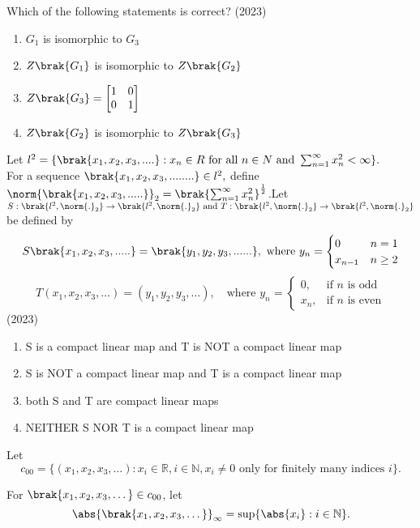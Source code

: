     Which of the following statements is correct?   \hfill (2023) 
    \begin{enumerate}[label=(\Alph*)]
        \item $G_1$ is isomorphic to $G_3$
        \item $Z\brak{G_1}$ is isomorphic to $Z\brak{G_2}$
        \item $Z\brak{G_3} = \begin{bmatrix}1&0\\0&1\end{bmatrix}$
        \item $Z\brak{G_2}$ is isomorphic to $Z\brak{G_3}$
    \end{enumerate}
    \item Let $l^2 = \{\brak{x_1, x_2, x_3,....}: x_n \in R \text{ for all }n\in N \text{ and }\sum_{n=1}^{\infty}x_n^2 <\infty\}.$\\ For a sequence $\brak{x_1, x_2, x_3, ........}\in l^2,$ define $\norm{\brak{x_1,x_2,x_3,.....}}_2 = \brak{\sum_{n=1}^{\infty}x_n^2}^\frac{1}{2}$.Let $S:\brak{l^2, \norm{.}_2}\to \brak{l^2, \norm{.}_2} \text{ and }T:\brak{l^2, \norm{.}_2}\to \brak{l^2, \norm{.}_2}$ be defined by $$S\brak{x_1, x_2, x_3,.....}=\brak{y_1,y_2,y_3,......}, \text{ where  } y_n = \begin{cases}0 & n=1\\x_{n-1}&n\geq 2\end{cases}$$  $$T(x_1, x_2, x_3, \dots) = (y_1, y_2, y_3, \dots), \quad \text{where } y_n = \begin{cases} 0, & \text{if } n \text{ is odd} \\x_n, & \text{if } n \text{ is even}\end{cases}$$\hfill (2023)
    \begin{enumerate}[label=(\Alph*)]
        \item S is a compact linear map and T is NOT a compact linear map
        \item S is NOT a compact linear map and T is a compact linear map
        \item both S and T are compact linear maps
        \item NEITHER S NOR T is a compact linear map
    \end{enumerate}
    \item Let $$
c_{00} = \{(x_1, x_2, x_3, \dots) : x_i \in \mathbb{R}, i \in \mathbb{N}, x_i \neq 0 \text{ only for finitely many indices } i\}.$$

For $\brak{x_1, x_2, x_3, \dots} \in c_{00}$, let
$$
\abs{\brak{x_1, x_2, x_3, \dots}}_{\infty} = \sup \{ \abs{x_i} : i \in \mathbb{N} \}.
$$

